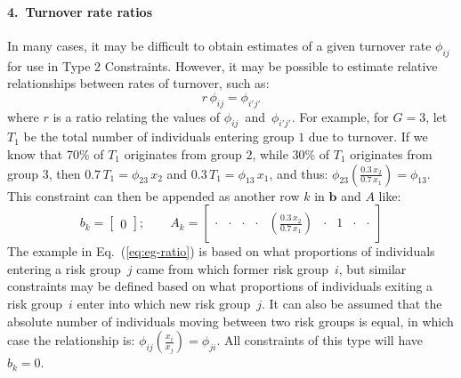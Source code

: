 \paragraph{4.~Turnover rate ratios}
\label{con:rel-turnover}
In many cases, it may be difficult to
obtain estimates of a given turnover rate $\phi_{ij}$
for use in Type 2 Constraints.
However, it may be possible to estimate
relative relationships between rates of turnover,
such as:
\begin{equation}\label{eq:ratio}
r\,\phi_{ij} = \phi_{i'j'}
\end{equation}
where $r$ is a ratio relating the values of $\phi_{ij}$~and~$\phi_{i'j'}$.
For example, for $G = 3$,
let $T_1$ be the total number of individuals entering group $1$ due to turnover.
If we know that
70\% of $T_1$ originates from group $2$, while
30\% of $T_1$ originates from group $3$,
then $0.7\,T_1 = \phi_{23} \, x_2$ and $0.3\,T_1 = \phi_{13} \, x_1$,
and thus: $\phi_{23} \left(\frac{0.3\,x_2}{0.7\,x_1}\right) = \phi_{13}$.
This constraint can then be appended as another row $k$ in $\bm{b}$ and $A$ like:
\begin{equation}\label{eq:eg-ratio}
b_k = \left[\begin{array}{c}
0
\end{array}\right];\qquad
A_k = \left[\begin{array}{ccccccccc}
  \cdot & \cdot & \cdot & \cdot & \left(\frac{0.3\,x_2}{0.7\,x_1}\right) & \cdot & 1 & \cdot & \cdot
\end{array}\right] 
\end{equation}
The example in Eq.~(\ref{eq:eg-ratio}) is based on
what proportions of individuals entering a risk group~$j$
came from which former risk group~$i$,
but similar constraints may be defined based on
what proportions of individuals exiting a risk group~$i$
enter into which new risk group~$j$.
It can also be assumed that
the absolute number of individuals moving between two risk groups is equal,
in which case the relationship is:
$\phi_{ij} \left(\frac{x_i}{x_j}\right) = \phi_{ji}$.
All constraints of this type will have $b_k = 0$.
